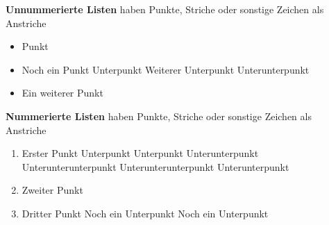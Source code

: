 \textbf{Unnummerierte Listen} haben Punkte, Striche oder sonstige Zeichen als Anstriche


\begin{itemize}
	\item Punkt
	\item Noch ein Punkt
	\subitem Unterpunkt
	\subitem Weiterer Unterpunkt
	\subsubitem Unterunterpunkt
	\item Ein weiterer Punkt
\end{itemize}


\textbf{Nummerierte Listen} haben Punkte, Striche oder sonstige Zeichen als Anstriche


\begin{enumerate}
	\item Erster Punkt
		\subitem Unterpunkt
		\subitem Unterpunkt
			\subsubitem  Unterunterpunkt
		\subsubitem Unterunterunterpunkt
		\subsubitem Unterunterunterpunkt
	\subsubitem Unterunterpunkt
	\item Zweiter Punkt
	\item Dritter Punkt
	\subitem Noch ein Unterpunkt
	\subitem Noch ein Unterpunkt
\end{enumerate}
